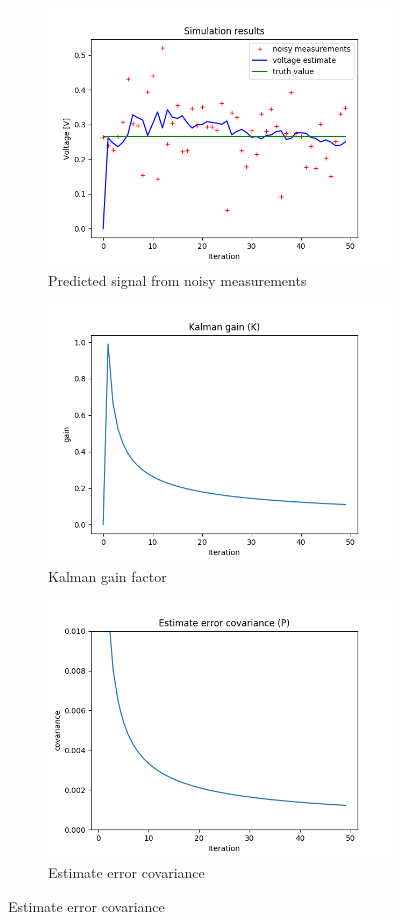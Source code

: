 \documentclass{article}
\begin{document}
    \begin{figure}[H]
        \begin{subfigure} {.5\textwidth}  
            \centering 
            \includegraphics[width=0.6\linewidth]{./img/r01q_.png}
            \caption{Predicted signal from noisy measurements }
        \end{subfigure}
        \begin{subfigure}{.5\textwidth}            
            \centering
            \includegraphics[width=0.6\linewidth]{./img/r01q_K.png}
            \caption{Kalman gain factor}
        \end{subfigure}
        \begin{subfigure} {.5\textwidth}  
            \centering 
            \includegraphics[width=0.6\linewidth]{./img/r01q_P.png}
            \caption{Estimate error covariance}

\end{subfigure}
\end{figure}
\end{document}
